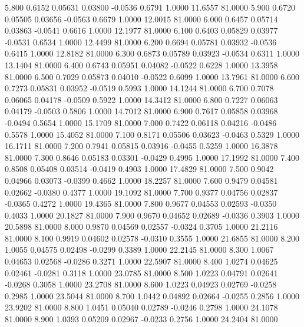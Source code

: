    5.800   0.6152   0.05631   0.03800  -0.0536   0.6791   1.0000  11.6557  81.0000
   5.900   0.6720   0.05505   0.03656  -0.0563   0.6679   1.0000  12.0015  81.0000
   6.000   0.6457   0.05714   0.03863  -0.0541   0.6616   1.0000  12.1977  81.0000
   6.100   0.6403   0.05829   0.03977  -0.0531   0.6534   1.0000  12.4499  81.0000
   6.200   0.6694   0.05781   0.03932  -0.0536   0.6415   1.0000  12.8182  81.0000
   6.300   0.6873   0.05789   0.03923  -0.0534   0.6311   1.0000  13.1404  81.0000
   6.400   0.6743   0.05951   0.04082  -0.0522   0.6228   1.0000  13.3958  81.0000
   6.500   0.7029   0.05873   0.04010  -0.0522   0.6099   1.0000  13.7961  81.0000
   6.600   0.7273   0.05831   0.03952  -0.0519   0.5993   1.0000  14.1244  81.0000
   6.700   0.7078   0.06065   0.04178  -0.0509   0.5922   1.0000  14.3412  81.0000
   6.800   0.7227   0.06063   0.04179  -0.0503   0.5806   1.0000  14.7012  81.0000
   6.900   0.7617   0.05858   0.03968  -0.0494   0.5654   1.0000  15.1709  81.0000
   7.000   0.7422   0.06118   0.04216  -0.0486   0.5578   1.0000  15.4052  81.0000
   7.100   0.8171   0.05506   0.03623  -0.0463   0.5329   1.0000  16.1711  81.0000
   7.200   0.7941   0.05815   0.03916  -0.0455   0.5259   1.0000  16.3878  81.0000
   7.300   0.8646   0.05183   0.03301  -0.0429   0.4995   1.0000  17.1992  81.0000
   7.400   0.8508   0.05408   0.03514  -0.0419   0.4903   1.0000  17.4829  81.0000
   7.500   0.9042   0.04966   0.03073  -0.0399   0.4662   1.0000  18.2257  81.0000
   7.600   0.9479   0.04581   0.02662  -0.0380   0.4377   1.0000  19.1092  81.0000
   7.700   0.9377   0.04756   0.02837  -0.0365   0.4272   1.0000  19.4365  81.0000
   7.800   0.9677   0.04553   0.02593  -0.0350   0.4033   1.0000  20.1827  81.0000
   7.900   0.9670   0.04652   0.02689  -0.0336   0.3903   1.0000  20.5898  81.0000
   8.000   0.9870   0.04569   0.02557  -0.0324   0.3705   1.0000  21.2116  81.0000
   8.100   0.9919   0.04602   0.02578  -0.0310   0.3555   1.0000  21.6855  81.0000
   8.200   1.0055   0.04575   0.02498  -0.0299   0.3389   1.0000  22.2145  81.0000
   8.300   1.0067   0.04653   0.02568  -0.0286   0.3271   1.0000  22.5907  81.0000
   8.400   1.0274   0.04625   0.02461  -0.0281   0.3118   1.0000  23.0785  81.0000
   8.500   1.0223   0.04791   0.02641  -0.0268   0.3058   1.0000  23.2708  81.0000
   8.600   1.0223   0.04923   0.02769  -0.0258   0.2985   1.0000  23.5044  81.0000
   8.700   1.0442   0.04892   0.02664  -0.0255   0.2856   1.0000  23.9202  81.0000
   8.800   1.0451   0.05040   0.02789  -0.0246   0.2798   1.0000  24.1078  81.0000
   8.900   1.0393   0.05209   0.02967  -0.0233   0.2756   1.0000  24.2404  81.0000
